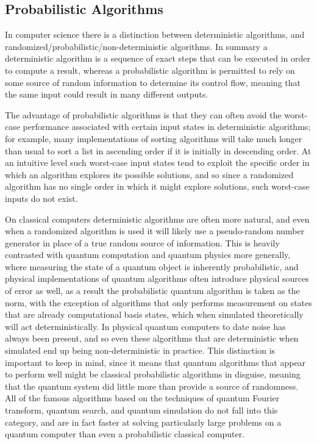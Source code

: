 \subsection{Probabilistic Algorithms}
In computer science there is a distinction between deterministic algorithms, and randomized/probabilistic/non-deterministic algorithms. In summary a deterministic algorithm is a sequence of exact steps that can be executed in order to compute a result, whereas a probabilistic algorithm is permitted to rely on some source of random information to determine its control flow, meaning that the same input could result in many different outputs.

The advantage of probabilistic algorithms is that they can often avoid the worst-case performance associated with certain input states in deterministic algorithms; for example, many implementations of sorting algorithms will take much longer than usual to sort a list in ascending order if it is initially in descending order. At an intuitive level such worst-case input states tend to exploit the specific order in which an algorithm explores its possible solutions, and so since a randomized algorithm has no single order in which it might explore solutions, such worst-case inputs do not exist.

On classical computers deterministic algorithms are often more natural, and even when a randomized algorithm is used it will likely use a pseudo-random number generator in place of a true random source of information. This is heavily contrasted with quantum computation and quantum physics more generally, where measuring the state of a quantum object is inherently probabilistic, and physical implementations of quantum algorithms often introduce physical sources of error as well, as a result the probabilistic quantum algorithm is taken as the norm, with the exception of algorithms that only performs measurement on states that are already computational basis states, which when simulated theoretically will act deterministically. In physical quantum computers to date noise has always been present, and so even these algorithms that are deterministic when simulated end up being non-deterministic in practice. This distinction is important to keep in mind, since it means that quantum algorithms that appear to perform well might be classical probabilistic algorithms in disguise, meaning that the quantum system did little more than provide a source of randomness. All of the famous algorithms based on the techniques of quantum Fourier transform, quantum search, and quantum simulation do not fall into this category, and are in fact faster at solving particularly large problems on a quantum computer than even a probabilistic classical computer.


